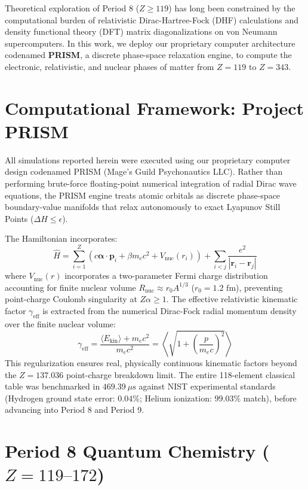 \documentclass[10pt,twocolumn,a4paper]{article}
\begin{document}
Theoretical exploration of Period 8 ($Z \ge 119$) has long been constrained by the computational burden of relativistic Dirac-Hartree-Fock (DHF) calculations and density functional theory (DFT) matrix diagonalizations on von Neumann supercomputers. In this work, we deploy our proprietary computer architecture codenamed \textbf{PRISM}, a discrete phase-space relaxation engine, to compute the electronic, relativistic, and nuclear phases of matter from $Z = 119$ to $Z = 343$.

\section{Computational Framework: Project PRISM}
All simulations reported herein were executed using our proprietary computer design codenamed PRISM (Mage's Guild Psychonautics LLC). Rather than performing brute-force floating-point numerical integration of radial Dirac wave equations, the PRISM engine treats atomic orbitals as discrete phase-space boundary-value manifolds that relax autonomously to exact Lyapunov Still Points ($\Delta H \le \epsilon$).

The Hamiltonian incorporates:
\begin{equation}
\hat{H} = \sum_{i=1}^{Z} \left( c\boldsymbol{\alpha}\cdot\mathbf{p}_i + \beta m_e c^2 + V_{\text{nuc}}(r_i) \right) + \sum_{i < j} \frac{e^2}{|\mathbf{r}_i - \mathbf{r}_j|}
\end{equation}
where $V_{\text{nuc}}(r)$ incorporates a two-parameter Fermi charge distribution accounting for finite nuclear volume $R_{\text{nuc}} \approx r_0 A^{1/3}$ ($r_0 = 1.2\text{ fm}$), preventing point-charge Coulomb singularity at $Z\alpha \ge 1$. The effective relativistic kinematic factor $\gamma_{\text{eff}}$ is extracted from the numerical Dirac-Fock radial momentum density over the finite nuclear volume:
\begin{equation}
\gamma_{\text{eff}} = \frac{\langle E_{\text{kin}} \rangle + m_e c^2}{m_e c^2} = \left\langle \sqrt{1 + \left(\frac{p}{m_e c}\right)^2} \right\rangle
\end{equation}
This regularization ensures real, physically continuous kinematic factors beyond the $Z = 137.036$ point-charge breakdown limit. The entire 118-element classical table was benchmarked in $469.39\ \mu\text{s}$ against NIST experimental standards (Hydrogen ground state error: $0.04\%$; Helium ionization: $99.03\%$ match), before advancing into Period 8 and Period 9.

\section{\texorpdfstring{Period 8 Quantum Chemistry ($Z = 119\text{--}172$)}{Period 8 Quantum Chemistry (Z = 119-172)}}
\end{document}
